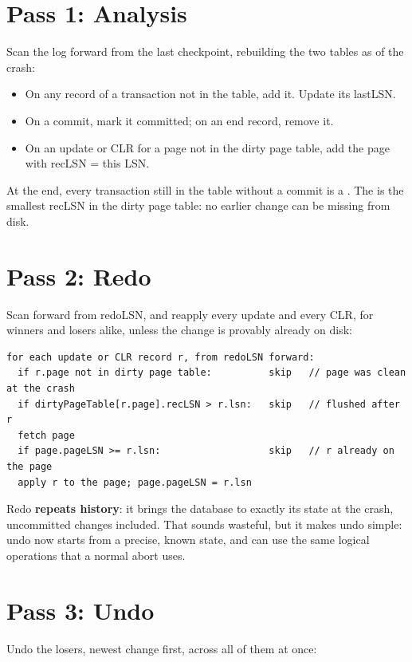 \section{Pass 1: Analysis}

Scan the log forward from the last checkpoint, rebuilding the two tables as of
the crash:

\begin{itemize}
\item On any record of a transaction not in the table, add it. Update its lastLSN.
\item On a commit, mark it committed; on an end record, remove it.
\item On an update or CLR for a page not in the dirty page table, add the page with recLSN = this LSN.
\end{itemize}

At the end, every transaction still in the table without a commit is a
. The  is the smallest recLSN in the dirty page table:
no earlier change can be missing from disk.

\section{Pass 2: Redo}

Scan forward from redoLSN, and reapply every update and every CLR, for winners
and losers alike, unless the change is provably already on disk:

\begin{lstlisting}[language=pseudo]
for each update or CLR record r, from redoLSN forward:
  if r.page not in dirty page table:          skip   // page was clean at the crash
  if dirtyPageTable[r.page].recLSN > r.lsn:   skip   // flushed after r
  fetch page
  if page.pageLSN >= r.lsn:                   skip   // r already on the page
  apply r to the page; page.pageLSN = r.lsn
\end{lstlisting}

Redo \textbf{repeats history}: it brings the database to exactly its state at
the crash, uncommitted changes included. That sounds wasteful, but it makes undo
simple: undo now starts from a precise, known state, and can use the same
logical operations that a normal abort uses.

\section{Pass 3: Undo}

Undo the losers, newest change first, across all of them at once:

